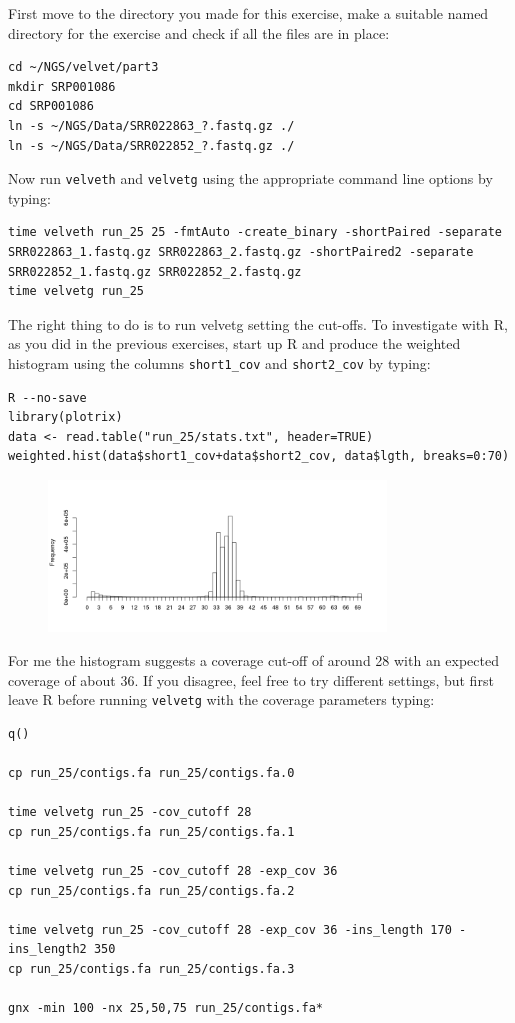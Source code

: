 \begin{steps}
First move to the directory you made for this exercise, make a suitable named
directory for the exercise and check if all the files are in place:
\begin{lstlisting}
cd ~/NGS/velvet/part3
mkdir SRP001086
cd SRP001086
ln -s ~/NGS/Data/SRR022863_?.fastq.gz ./
ln -s ~/NGS/Data/SRR022852_?.fastq.gz ./
\end{lstlisting}

Now run \texttt{velveth} and \texttt{velvetg} using the appropriate command line
options by typing:
\begin{lstlisting}
time velveth run_25 25 -fmtAuto -create_binary -shortPaired -separate SRR022863_1.fastq.gz SRR022863_2.fastq.gz -shortPaired2 -separate SRR022852_1.fastq.gz SRR022852_2.fastq.gz
time velvetg run_25
\end{lstlisting}

The right thing to do is to run velvetg setting the cut-offs. To investigate
with R, as you did in the previous exercises, start up R and produce the
weighted histogram using the columns \texttt{short1\_cov} and
\texttt{short2\_cov} by typing:
\begin{lstlisting}
R --no-save
library(plotrix) 
data <- read.table("run_25/stats.txt", header=TRUE) 
weighted.hist(data$short1_cov+data$short2_cov, data$lgth, breaks=0:70)
\end{lstlisting}

\begin{figure}[H]
\centering
\includegraphics[width=0.8\textwidth]{de_novo/velvet/velvet_Rplot004.png}
\caption{\label{fig:velvet_Rplot004}}
\end{figure}

For me the histogram suggests a coverage cut-off of around 28
with an expected coverage of about 36. If you disagree, feel free to try
different settings, but first leave R before running \texttt{velvetg} with the coverage
parameters typing:
\begin{lstlisting}
q()

cp run_25/contigs.fa run_25/contigs.fa.0

time velvetg run_25 -cov_cutoff 28 
cp run_25/contigs.fa run_25/contigs.fa.1

time velvetg run_25 -cov_cutoff 28 -exp_cov 36 
cp run_25/contigs.fa run_25/contigs.fa.2

time velvetg run_25 -cov_cutoff 28 -exp_cov 36 -ins_length 170 -ins_length2 350
cp run_25/contigs.fa run_25/contigs.fa.3

gnx -min 100 -nx 25,50,75 run_25/contigs.fa*
\end{lstlisting}

\end{steps}

